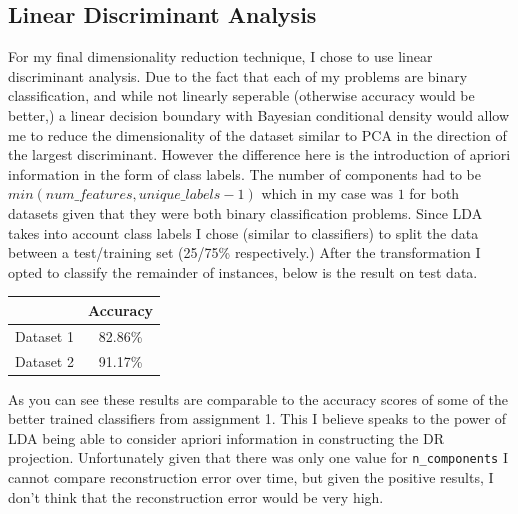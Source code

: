 \subsection{Linear Discriminant Analysis}\label{subsec:linear-discriminant-analysis}
For my final dimensionality reduction technique, I chose to use linear discriminant analysis.
Due to the fact that each of my problems are binary classification, and while not linearly seperable (otherwise accuracy would be better,)
a linear decision boundary with Bayesian conditional density would allow me to reduce the dimensionality of the dataset similar
to PCA in the direction of the largest discriminant.
However the difference here is the introduction of apriori information in the form of class labels.
The number of components had to be $min(num\_features, unique\_labels - 1)$ which in my case was $1$ for both datasets given
that they were both binary classification problems.
Since LDA takes into account class labels I chose (similar to classifiers) to split the data between a test/training set (25/75\% respectively.)
After the transformation I opted to classify the remainder of instances, below is the result on test data.
\begin{center}
    \begin{tabular}{|c| c |}
        \hline
        & Accuracy \\
        \hline
        \hline
        Dataset 1 & 82.86\%  \\
        \hline
        Dataset 2 & 91.17\%  \\
        \hline
    \end{tabular}
\end{center}
As you can see these results are comparable to the accuracy scores of some of the better trained classifiers from assignment 1.
This I believe speaks to the power of LDA being able to consider apriori information in constructing the DR projection.
Unfortunately given that there was only one value for \texttt{n\_components} I cannot compare reconstruction error over time,
but given the positive results, I don't think that the reconstruction error would be very high.